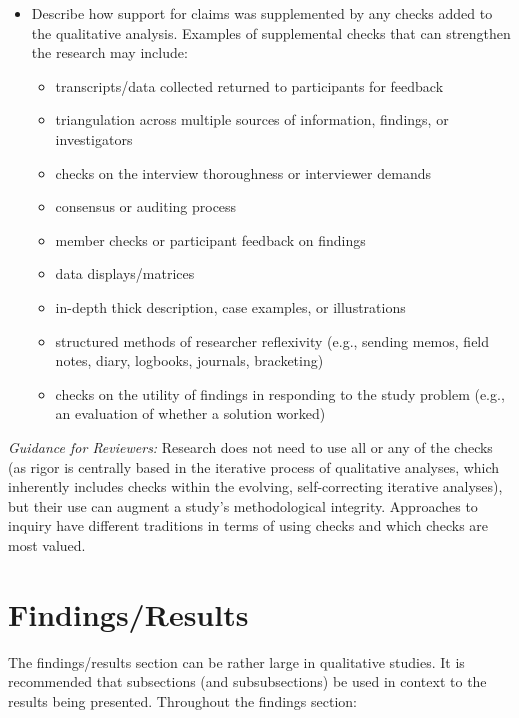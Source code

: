 \documentclass[acmsmall]{acmart}
\begin{document}
\begin{itemize}
    \item Describe how support for claims was supplemented by any checks added to the qualitative
    analysis. Examples of supplemental checks that can strengthen the research may include:
        \begin{itemize}
            \item transcripts/data collected returned to participants for feedback
            \item  triangulation across multiple sources of information, findings, or investigators
            \item  checks on the interview thoroughness or interviewer demands
            \item  consensus or auditing process
            \item  member checks or participant feedback on findings
            \item  data displays/matrices
            \item  in-depth thick description, case examples, or illustrations
            \item  structured methods of researcher reflexivity (e.g., sending memos, field notes, diary,
            logbooks, journals, bracketing)
            \item  checks on the utility of findings in responding to the study problem (e.g., an evaluation of
            whether a solution worked)
        \end{itemize}
\end{itemize}
 
\textit{Guidance for Reviewers:} Research does not need to use all or any of the checks (as rigor is centrally based in the iterative process of qualitative analyses, which inherently includes checks within the evolving, self-correcting iterative analyses), but their use can augment a study’s methodological integrity. Approaches to inquiry have different traditions in terms of using
checks and which checks are most valued.

\section{Findings/Results}

The findings/results section can be rather large in qualitative studies. It is recommended that subsections (and subsubsections) be used in context to the results being presented. Throughout the findings section:
\end{document}
